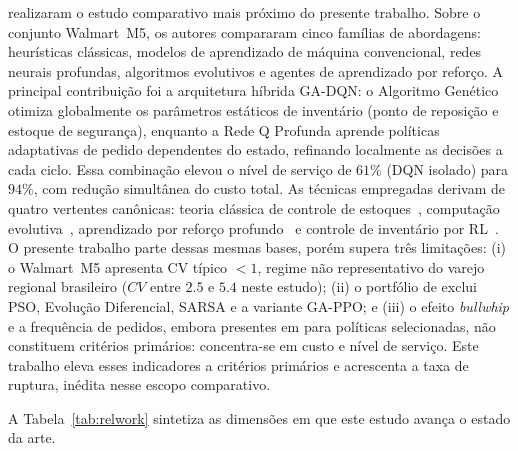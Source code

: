 \documentclass[a4paper,11pt]{article}
\begin{document}
\citet{zabraoui:2025} realizaram o estudo comparativo mais próximo do
presente trabalho. Sobre o conjunto Walmart~M5, os autores compararam
cinco famílias de abordagens: heurísticas clássicas, modelos de
aprendizado de máquina convencional, redes neurais profundas,
algoritmos evolutivos e agentes de aprendizado por reforço. A
principal contribuição foi a arquitetura híbrida GA-DQN: o
Algoritmo Genético otimiza globalmente os parâmetros estáticos de
inventário (ponto de reposição e estoque de segurança), enquanto a
Rede Q Profunda aprende políticas adaptativas de pedido dependentes
do estado, refinando localmente as decisões a cada ciclo. Essa
combinação elevou o nível de serviço de $61\%$ (DQN isolado) para $94\%$,
com redução simultânea do custo total. As técnicas empregadas derivam
de quatro vertentes canônicas: teoria clássica de controle de
estoques~\citep{harris:1913,hadley:1963,cachon:2009}, computação
evolutiva~\citep{holland:1975}, aprendizado por reforço
profundo~\citep{mnih:2015} e controle de inventário por
RL~\citep{oroojlooyjadid:2022}. O presente trabalho parte dessas
mesmas bases, porém supera três limitações: (i) o Walmart~M5
apresenta CV típico $< 1$, regime não representativo do varejo
regional brasileiro ($CV$ entre $2.5$ e $5.4$ neste estudo);
(ii) o portfólio de \citet{zabraoui:2025} exclui PSO, Evolução
Diferencial, SARSA e a variante GA-PPO; e (iii) o efeito \textit{bullwhip} e a frequência de pedidos, embora
presentes em \citet{zabraoui:2025} para políticas selecionadas, não
constituem critérios primários: \citet{zabraoui:2025} concentra-se
em custo e nível de serviço. Este trabalho eleva esses indicadores a
critérios primários e acrescenta a taxa de ruptura, inédita nesse
escopo comparativo.

A Tabela~\ref{tab:relwork} sintetiza as dimensões em que este estudo
avança o estado da arte.
\end{document}
